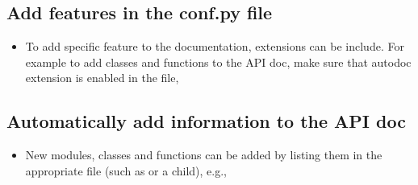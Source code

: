 \documentclass[letterpaper,10pt,english]{sphinxmanual}
\begin{document}
\begin{sphinxVerbatim}[commandchars=\\\{\}]
 
    
    

\end{sphinxVerbatim}


\subsection{Add features in the conf.py file}
\label{\detokenize{README-docs:add-features-in-the-conf-py-file}}\begin{itemize}
\item {} 
To add specific feature to the documentation, extensions can be include.
For example to add classes and functions to the API doc, make sure that autodoc
extension is enabled in the  file,

\end{itemize}

\begin{sphinxVerbatim}[commandchars=\\\{\}]
  \PYG{p}{[}\PYG{p}{]}
\end{sphinxVerbatim}


\subsection{Automatically add information to the API doc}
\label{\detokenize{README-docs:automatically-add-information-to-the-api-doc}}\begin{itemize}
\item {} 
New modules, classes and functions can be added by listing them
in the appropriate  file (such as  or a child), e.g.,

\end{itemize}

\begin{sphinxVerbatim}[commandchars=\\\{\}]
  
\end{sphinxVerbatim}
\end{document}
